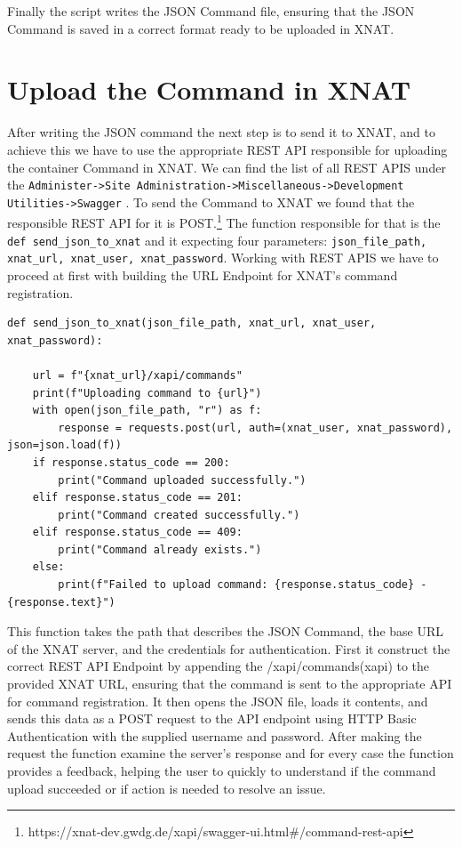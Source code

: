  Finally the script writes the JSON Command file, ensuring that the JSON Command is saved in a correct format ready to be uploaded in XNAT.
 
 \section{Upload the Command in XNAT}

 After writing the JSON command the next step is to send it to XNAT, and to achieve this we have to use the appropriate REST API responsible for uploading the container Command in XNAT.
 We can find the list of all REST APIS under the \texttt{Administer->Site Administration->Miscellaneous->Development Utilities->Swagger} .
 To send the Command to XNAT we found that the responsible REST API for it is POST.\footnote{https://xnat-dev.gwdg.de/xapi/swagger-ui.html\#/command-rest-api}
 The function responsible for that is the \texttt{def send\_json\_to\_xnat} and it expecting four parameters: \texttt{json\_file\_path, xnat\_url, xnat\_user, xnat\_password}. Working with REST APIS we have to proceed at first with building the URL Endpoint for XNAT’s command registration.
 
\begin{lstlisting}
def send_json_to_xnat(json_file_path, xnat_url, xnat_user, xnat_password): 

    url = f"{xnat_url}/xapi/commands"
    print(f"Uploading command to {url}")
    with open(json_file_path, "r") as f:
        response = requests.post(url, auth=(xnat_user, xnat_password), json=json.load(f))
    if response.status_code == 200:
        print("Command uploaded successfully.")
    elif response.status_code == 201:
        print("Command created successfully.")
    elif response.status_code == 409:
        print("Command already exists.")
    else:
        print(f"Failed to upload command: {response.status_code} - {response.text}")

\end{lstlisting}

This function takes the path that describes the JSON Command, the base URL of the XNAT server, and the credentials for authentication. First it construct the correct REST API Endpoint by appending the /xapi/commands(xapi) to the provided XNAT URL, ensuring that the command is sent to the appropriate API for command registration. It then opens the JSON file, loads it contents, and sends this data as a POST request to the API endpoint using \ac{HTTP} Basic Authentication with the supplied username and password. After making the request the function examine the server's response and for every case the function provides a feedback, helping the user to quickly to understand if the command upload succeeded or if action is needed to resolve an issue. 

